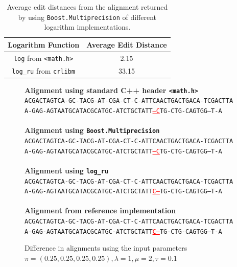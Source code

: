 \documentclass[runningheads,a4paper]{llncs}
\begin{document}
\begin{table}[h!]

\centering

\begin{tabular}{|c|c|}
\hline 
Logarithm Function & Average Edit Distance \\ 
\hline 
\texttt{log} from \texttt{<math.h>} & 2.15 \\ 
\hline 
\texttt{log\_ru} from \texttt{crlibm} & 33.15 \\ 
\hline 
\end{tabular} 
\caption{Average edit distances from the alignment returned by using  \texttt{Boost.Multiprecision} of different logarithm implementations.}
\label{fig:dist}
\end{table}


\begin{figure}

\textbf{Alignment using standard C++ header \texttt{<math.h>}}
~
\\
\texttt{ACGACTAGTCA-GC-TACG-AT-CGA-CT-C-ATTCAACTGACTGACA-TCGACTTA} \\
\texttt{A-GAG-AGTAATGCATACGCATGC-ATCTGCTATT\textcolor{red}{\underline{---C}}TG-CTG-CAGTGG--T-A}
\\~\\
\textbf{Alignment using \texttt{Boost.Multiprecision}}
~
\\
\texttt{ACGACTAGTCA-GC-TACG-AT-CGA-CT-C-ATTCAACTGACTGACA-TCGACTTA} \\
\texttt{A-GAG-AGTAATGCATACGCATGC-ATCTGCTATT\textcolor{red}{\underline{---C}}TG-CTG-CAGTGG--T-A}
\\~\\
\textbf{Alignment using \texttt{log\_ru}}
~
\\
\texttt{ACGACTAGTCA-GC-TACG-AT-CGA-CT-C-ATTCAACTGACTGACA-TCGACTTA} \\
\texttt{A-GAG-AGTAATGCATACGCATGC-ATCTGCTATT\textcolor{red}{\underline{C---}}TG-CTG-CAGTGG--T-A}
\\~\\
\textbf{Alignment from reference implementation}
~
\\
\texttt{ACGACTAGTCA-GC-TACG-AT-CGA-CT-C-ATTCAACTGACTGACA-TCGACTTA} \\
\texttt{A-GAG-AGTAATGCATACGCATGC-ATCTGCTATT\textcolor{red}{\underline{C---}}TG-CTG-CAGTGG--T-A}

\caption{Difference in alignments using the input parameters $\pi=(0.25,0.25,0.25,0.25), \lambda=1, \mu = 2, \tau = 0.1$}
\label{fig:alignments}
\end{figure}
\end{document}
